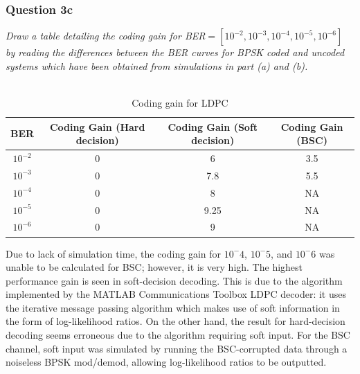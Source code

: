 \documentclass[a4paper]{article}
\begin{document}
\subsubsection{Question 3c} \textit{Draw a table detailing the coding gain for BER$= [10^{-2}, 10^{-3}, 10^{-4} , 10^{-5} , 10^{-6} ]$ by reading the differences between the BER curves for BPSK coded and uncoded systems which have been obtained from simulations in part (a) and (b).}\\
\\

\begin{table}[H]
\centering
\begin{tabular}{| c | c | c | c |}
\hline
BER &  Coding Gain (Hard decision) & Coding Gain (Soft decision)  & Coding Gain (BSC)\\
\hline
$10^{-2}$ & 0 & 6  & 3.5\\
\hline
$10^{-3}$ & 0 & 7.8 & 5.5\\
\hline
$10^{-4}$ & 0 & 8 & NA \\
\hline
$10^{-5}$ & 0 & 9.25 & NA \\
\hline
$10^{-6}$ & 0 & 9 & NA \\
\hline
\end{tabular}
\caption{Coding gain for LDPC}
\end{table}

Due to lack of simulation time, the coding gain for $10^-4$, $10^-5$, and $10^-6$ was unable
to be calculated for BSC; however, it is very high. The highest performance gain is seen in soft-decision decoding. This is due to the algorithm implemented by the MATLAB Communications Toolbox LDPC decoder: it uses the iterative message passing algorithm which makes use of soft information in the form of log-likelihood ratios. On the other hand, the result for hard-decision decoding seems erroneous due to the algorithm requiring soft input. For the BSC channel,  soft input was simulated by running the BSC-corrupted data through a noiseless BPSK mod/demod, allowing log-likelihood ratios to be outputted.
 

\end{document}

